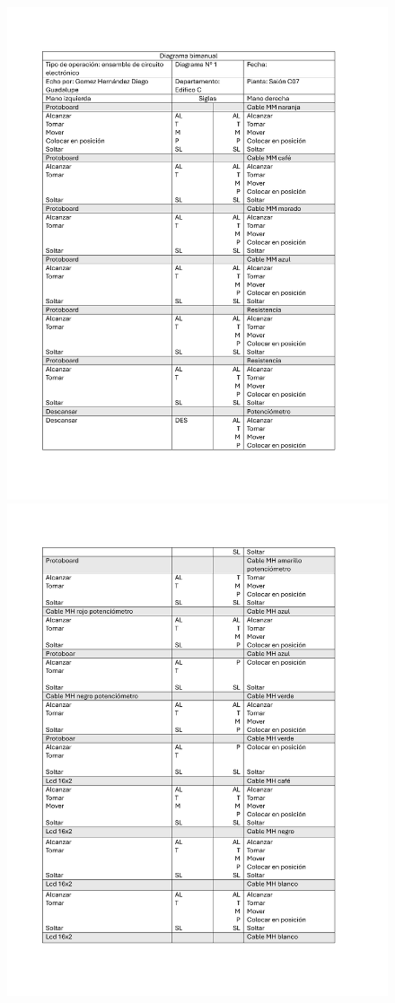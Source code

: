 \begin{figure}[H]
    \centering
    \includegraphics[scale=0.22]{13/img/diagramaBimanualUno.pdf}
    \centering
    \includegraphics[scale=0.22]{13/img/diagramaBimanualDos.pdf}

\end{figure}
